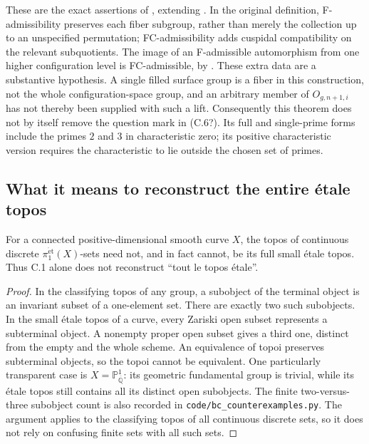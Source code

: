 These are the exact assertions of
\citet[Theorem 6.1, pp.~61--63]{HoshiMochizuki2011}, extending
\citet[Theorem 4.1]{Mochizuki2010BC}.  In the original definition,
F-admissibility preserves each fiber subgroup, rather than
merely the collection up to an unspecified permutation;
FC-admissibility adds cuspidal compatibility on the relevant
subquotients.  The image of an F-admissible automorphism from
one higher configuration level is FC-admissible, by
\citet[Theorem A and Corollary 1.9]{HoshiMochizukiTopicsBC}.
These extra data are a substantive hypothesis.  A single
filled surface group is a fiber in this construction, not the
whole configuration-space group, and an arbitrary member of
$O_{g,n+1,i}$ has not thereby been supplied with such a lift.
Consequently this theorem does not by itself remove the
question mark in (C.6?).  Its full and single-prime forms include
the primes $2$ and $3$ in characteristic zero; its positive
characteristic version requires the characteristic to lie
outside the chosen set of primes.

\subsection{What it means to reconstruct the entire \texorpdfstring{\'etale}{etale} topos}

For a connected positive-dimensional smooth curve $X$, the
topos of continuous discrete $\pi_1^{\mathrm{\acute et}}(X)$-sets
need not, and in fact cannot, be its full small \'etale topos.
Thus C.1 alone does not reconstruct ``tout le topos \'etale''.

\begin{proof}
In the classifying topos of any group, a subobject of the
terminal object is an invariant subset of a one-element set.
There are exactly two such subobjects.  In the small \'etale
topos of a curve, every Zariski open subset represents a
subterminal object.  A nonempty proper open subset gives a
third one, distinct from the empty and the whole scheme.
An equivalence of topoi preserves subterminal objects, so the
topoi cannot be equivalent.  One particularly transparent case
is $X=\mathbb P^1_{\overline{\mathbb Q}}$: its geometric
fundamental group is trivial, while its \'etale topos still
contains all its distinct open subobjects.  The finite
two-versus-three subobject count is also recorded in
\texttt{code/bc\_counterexamples.py}.  The argument applies to
the classifying topos of all continuous discrete sets, so it
does not rely on confusing finite sets with all such sets.
\end{proof}

